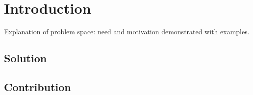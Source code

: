 \chapter{Introduction}

Explanation of problem space: need and motivation demonstrated with examples.

\section{Solution}

\section{Contribution}
